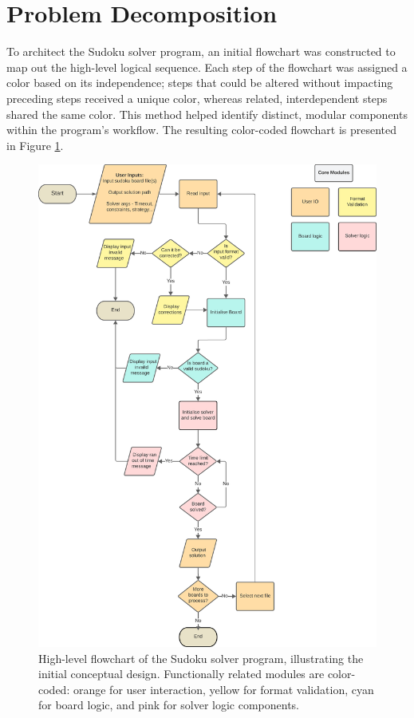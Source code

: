 \documentclass[11pt]{article}
\begin{document}
\section{Problem Decomposition}
To architect the Sudoku solver program, an initial flowchart was constructed to map out the high-level logical sequence. Each step of the flowchart was assigned a color based on its independence; steps that could be altered without impacting preceding steps received a unique color, whereas related, interdependent steps shared the same color. This method helped identify distinct, modular components within the program's workflow. The resulting color-coded flowchart is presented in Figure \ref{fig:solver_flowchart}.
\begin{figure}[H]
\centering
\includegraphics[width=1\textwidth]{figs/solver_flowchart.png}
\caption{High-level flowchart of the Sudoku solver program, illustrating the initial conceptual design. Functionally related modules are color-coded: orange for user interaction, yellow for format validation, cyan for board logic, and pink for solver logic components.}
\label{fig:solver_flowchart}
\end{figure}
\end{document}
